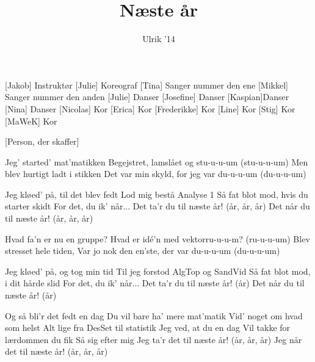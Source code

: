 \documentclass[a4paper,11pt]{article}
\title{Næste år}
\author{Ulrik '14}
\begin{document}
\maketitle

\begin{roles}
[Jakob] Instruktør
[Julie] Koreograf
[Tina] Sanger nummer den ene
[Mikkel] Sanger nummer den anden
[Julie] Danser
[Josefine] Danser
[Kaspian]Danser
[Nina] Danser
[Nicolas] Kor
[Erica] Kor
[Frederikke] Kor
[Line] Kor
[Stig] Kor
[MaWeK] Kor

\end{roles}

\begin{props}
[Person, der skaffer]
\end{props}


\begin{song}
 Jeg' started' mat'matikken
          Begejstret, lamslået og stu-u-u-um (stu-u-u-um)
          Men blev hurtigt ladt i stikken          
          Det var min skyld, for jeg var du-u-u-um (du-u-u-um)

 Jeg kløed' på, til det blev fedt
          Lod mig bestå Analyse 1
          Så fat blot mod, hvis du starter skidt 
          For det, du ik' når...
          Det ta'r du til næste år! (år, år, år)
          Det når du til næste år! (år, år, år)
          
 Hvad fa'n er nu en gruppe?
          Hvad er idé'n med vektorru-u-u-m? (ru-u-u-um)
          Blev stresset hele tiden,
          Var jo nok den en'ste, der var du-u-u-um (du-u-u-um)
          
 Jeg kløed' på, og tog min tid
          Til jeg forstod AlgTop og SandVid   
          Så fat blot mod, i dit hårde slid
          For det, du ik' når...
 Det ta'r du til næste år! (år)
            Det når du til næste år! (år)
          
 Og så bli'r det fedt en dag 
 Du vil bare ha' mere mat'matik
 Vid' noget om hvad som helst
 Alt lige fra DesSet til statistik
 Jeg ved, at du en dag
 Vil takke for lærdommen du fik
 Så sig efter mig
 Jeg ta'r det til næste år! (år, år, år)
            Jeg når det til næste år! (år, år, år)
      
\end{song}
\end{document}
